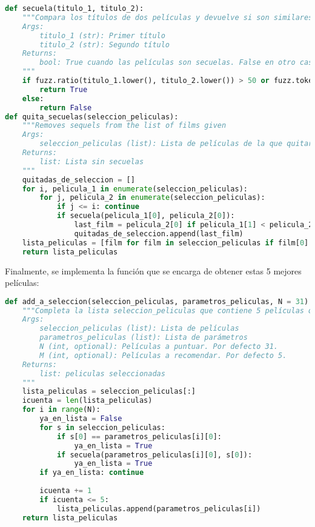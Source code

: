 \begin{lstlisting}[language=Python, label={lst:sequel},caption={Determinación de si dos películas son o no secuelas y eliminarlas. Se determina que dos películas son secuelas si tienen el mismo título o es muy similar.}]
def secuela(titulo_1, titulo_2):   
    """Compara los títulos de dos películas y devuelve si son similares o no
    Args:
        titulo_1 (str): Primer título
        titulo_2 (str): Segundo título
    Returns:
        bool: True cuando las películas son secuelas. False en otro caso
    """
    if fuzz.ratio(titulo_1.lower(), titulo_2.lower()) > 50 or fuzz.token_set_ratio(titulo_1.lower(), titulo_2.lower()) > 60:
        return True
    else:
        return False
def quita_secuelas(seleccion_peliculas):
    """Removes sequels from the list of films given
    Args:
        seleccion_peliculas (list): Lista de películas de la que quitar las secuelas
    Returns:
        list: Lista sin secuelas
    """ 
    quitadas_de_seleccion = []
    for i, pelicula_1 in enumerate(seleccion_peliculas):
        for j, pelicula_2 in enumerate(seleccion_peliculas):
            if j <= i: continue 
            if secuela(pelicula_1[0], pelicula_2[0]): 
                last_film = pelicula_2[0] if pelicula_1[1] < pelicula_2[1] else pelicula_1[0]
                quitadas_de_seleccion.append(last_film)
    lista_peliculas = [film for film in seleccion_peliculas if film[0] not in quitadas_de_seleccion]
    return lista_peliculas
\end{lstlisting}

Finalmente, se implementa la función que se encarga de obtener estas 5 mejores películas:

\begin{lstlisting}[language=Python, caption={Función  quese encarga de completar la selección de las 5 películas que se recomendarán.}]
def add_a_seleccion(seleccion_peliculas, parametros_peliculas, N = 31):
    """Completa la lista seleccion_peliculas que contiene 5 películas que se recomendarán al usuario. Las películas son seleccionadas de parametros_películas y sólo se tienen en cuenta si el título es suficientemente distinto del de otras películas.
    Args:
        seleccion_peliculas (list): Lista de películas
        parametros_peliculas (list): Lista de parámetros
        N (int, optional): Películas a puntuar. Por defecto 31.
        M (int, optional): Películas a recomendar. Por defecto 5.
    Returns:
        list: peliculas seleccionadas
    """
    lista_peliculas = seleccion_peliculas[:]
    icuenta = len(lista_peliculas)    
    for i in range(N):
        ya_en_lista = False
        for s in seleccion_peliculas:
            if s[0] == parametros_peliculas[i][0]: 
                ya_en_lista = True
            if secuela(parametros_peliculas[i][0], s[0]): 
                ya_en_lista = True            
        if ya_en_lista: continue
            
        icuenta += 1
        if icuenta <= 5:
            lista_peliculas.append(parametros_peliculas[i])
    return lista_peliculas
\end{lstlisting}

